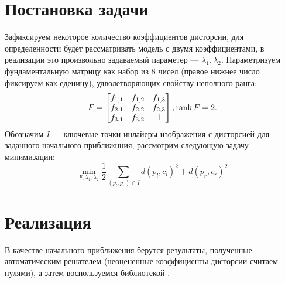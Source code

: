 \section{Постановка задачи}
Зафиксируем некоторое количество коэффициентов дисторсии, для определенности будет рассматривать модель с двумя коэффициентами, в реализации это произвольно задаваемый параметер --- $\lambda_1, 
\lambda_2$. Параметризуем фундаментальную матрицу как набор из 8 чисел (правое нижнее число фиксируем как еденицу), удволетворяющих свойству неполного ранга:
\begin{equation}
	F = \begin{bmatrix}
	f_{1,1} & f_{1,2} & f_{1,3} \\
	f_{2,1} & f_{2,2} & f_{2,3} \\
	f_{3,1} & f_{3,2} & 1 \\
	\end{bmatrix}, \operatorname{rank} F = 2.
\end{equation}
Обозначим $I$ --- ключевые точки-инлайеры изображения с дисторсией для заданного начального приближнния, рассмотрим следующую задачу минимизации: 
\begin{equation}
	\min\limits_{F, \lambda_1, \lambda_2} \frac{1}{2}\sum\limits_{\left(p_l, p_r\right) \in I} d\left(p_l, c_l\right)^2 + d\left(p_r, c_r\right)^2
\end{equation}

\section{Реализация}
В качестве начального приближения берутся результаты, полученные автоматическим решателем (неоцененные коэффициенты дисторсии считаем нулями), а затем \href{https://github.com/QuantumMechanicus/camera_calibration_test/blob/dev/subroutines/non_linear_optimizer/Non_Linear_Estimator.cpp}{воспользуемся} библиотекой \cite{ceres-solver}. 